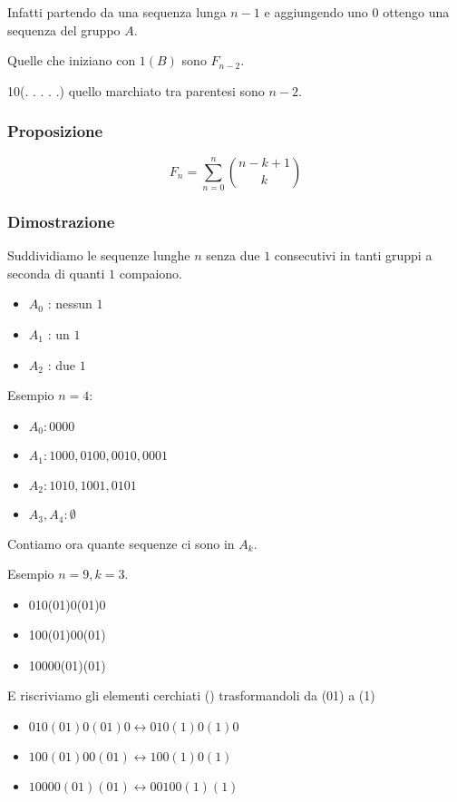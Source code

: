 \documentclass[11pt]{article}
\begin{document}
			Infatti partendo da una sequenza lunga $n-1$ e aggiungendo uno $0$
			ottengo una sequenza del gruppo $A$.

			Quelle che iniziano con $1 (B)$ sono $F_{n-2}$.

			10(. . . . .) quello marchiato tra parentesi sono $n-2$.
			
			\subsubsection{Proposizione}

			\[
				F_n = \sum_{n=0}^{n}
				\binom{n-k+1}{k}
			\]

			\subsubsection{Dimostrazione}

			Suddividiamo le sequenze lunghe $n$ senza due $1$ consecutivi
			in tanti gruppi a seconda di quanti $1$ compaiono.

			\begin{itemize}
				\item $A_0$ : nessun $1$
				\item $A_1$ : un $1$
				\item $A_2$ : due $1$
			\end{itemize}

			Esempio $n = 4$:

			\begin{itemize}
				\item $A_0 : 0000$ 
				\item $A_1 : 1000, 0100, 0010, 0001$
				\item $A_2 : 1010, 1001, 0101$
				\item $A_3, A_4	: \emptyset$
			\end{itemize}
			
			Contiamo ora quante sequenze ci sono in $A_k$.

			Esempio $n=9, k=3$.

			\begin{itemize}
				\item 010(01)0(01)0
				\item 100(01)00(01)
				\item 10000(01)(01)
			\end{itemize}

			E riscriviamo gli elementi cerchiati () trasformandoli
			da (01) a (1)

			\begin{itemize}
				\item $010(01)0(01)0 \longleftrightarrow 010(1)0(1)0$
				\item $100(01)00(01) \longleftrightarrow 100(1)0(1)$
				\item $10000(01)(01) \longleftrightarrow 00100(1)(1)$
			\end{itemize}
\end{document}
